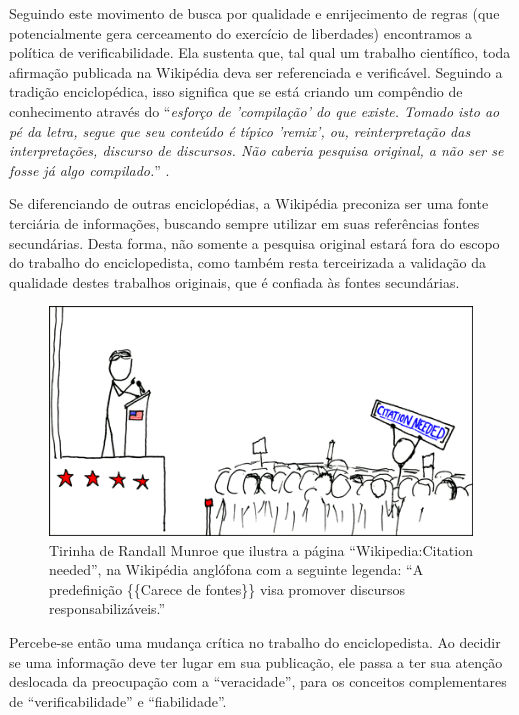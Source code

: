 Seguindo este movimento de busca por qualidade e enrijecimento de regras (que potencialmente gera cerceamento do exercício de liberdades) encontramos a política de verificabilidade. Ela sustenta que, tal qual um trabalho científico, toda afirmação publicada na Wikipédia deva ser referenciada e verificável. Seguindo a tradição enciclopédica, isso significa que se está criando um compêndio de conhecimento através do ``\textit{esforço de 'compilação' do que existe. Tomado isto ao pé da letra, segue que seu conteúdo é típico 'remix', ou, reinterpretação das interpretações, discurso de discursos. Não caberia pesquisa original, a não ser se fosse já algo compilado.}'' \citep{demo_conhecimento_2009}.

Se diferenciando de outras enciclopédias, a Wikipédia preconiza ser uma fonte terciária de informações, buscando sempre utilizar em suas referências fontes secundárias. Desta forma, não somente a pesquisa original estará fora do escopo do trabalho do enciclopedista, como também resta terceirizada a validação da qualidade destes trabalhos originais, que é confiada às fontes secundárias.


\begin{figure}[H]
    \centering
    \includegraphics[width=1\textwidth]{Images/tirinha_randall_munroe.png}
    \caption{Tirinha de Randall Munroe que ilustra a página ``Wikipedia:Citation needed'', na Wikipédia anglófona com a seguinte legenda: ``A predefinição \{\{Carece de fontes\}\} visa promover discursos responsabilizáveis.'' }
    \label{fig:tirinha_randall_munroe}
\end{figure}

Percebe-se então uma mudança crítica no trabalho do enciclopedista. Ao decidir se uma informação deve ter lugar em sua publicação, ele passa a ter sua atenção deslocada da preocupação com a ``veracidade'', para os conceitos complementares de ``verificabilidade'' e ``fiabilidade''.

